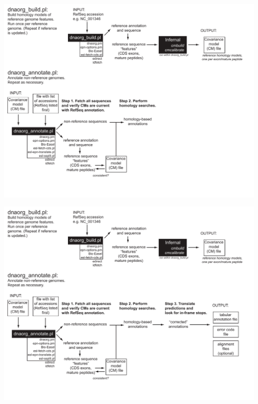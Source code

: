 \documentclass[landscape]{slides}
\begin{document}
\begin{slide}
\begin{center}
\includegraphics[width=10.5in]{figs/dnaorg-scripts-annotate3}
\vfill
\end{center}
\end{slide}
\begin{slide}
\begin{center}
\includegraphics[width=10.5in]{figs/dnaorg-scripts-annotate4}
\vfill
\end{center}
\end{slide}
\end{document}
